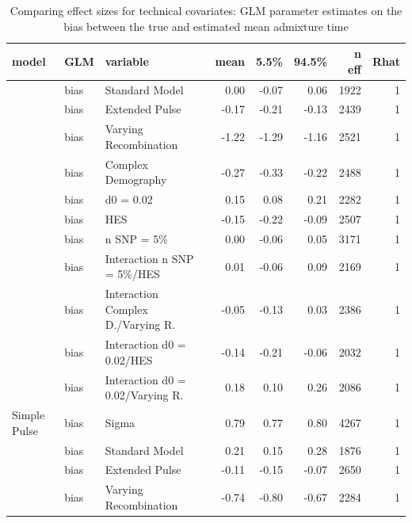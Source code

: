 \documentclass[11pt]{article}
\begin{document}
\begin{table}[H]
\fontsize{8}{9}\selectfont
\caption{\label{tab:table_Supplements_ests_bias}Comparing effect sizes for technical covariates: GLM parameter estimates on the bias between the true and estimated mean admixture time}
\centering

\begin{tabular}[t]{l|l|l|r|r|r|r|r}
\hline
model & GLM & variable & mean & 5.5\% & 94.5\% & n eff & Rhat\\
\hline
 & bias & Standard Model & 0.00 & -0.07 & 0.06 & 1922 & 1\\

 & bias & Extended Pulse & -0.17 & -0.21 & -0.13 & 2439 & 1\\

 & bias & Varying Recombination & -1.22 & -1.29 & -1.16 & 2521 & 1\\

 & bias & Complex Demography & -0.27 & -0.33 & -0.22 & 2488 & 1\\

 & bias & d0 = 0.02 & 0.15 & 0.08 & 0.21 & 2282 & 1\\

 & bias & HES & -0.15 & -0.22 & -0.09 & 2507 & 1\\

 & bias & n SNP = 5\% & 0.00 & -0.06 & 0.05 & 3171 & 1\\

 & bias & Interaction n SNP = 5\%/HES & 0.01 & -0.06 & 0.09 & 2169 & 1\\

 & bias & Interaction Complex D./Varying R. & -0.05 & -0.13 & 0.03 & 2386 & 1\\

 & bias & Interaction d0 = 0.02/HES & -0.14 & -0.21 & -0.06 & 2032 & 1\\

 & bias & Interaction d0 = 0.02/Varying R. & 0.18 & 0.10 & 0.26 & 2086 & 1\\

\multirow{-12}{*}{\raggedright\arraybackslash Simple Pulse} & bias & Sigma & 0.79 & 0.77 & 0.80 & 4267 & 1\\
\cline{1-8}
 & bias & Standard Model & 0.21 & 0.15 & 0.28 & 1876 & 1\\

 & bias & Extended Pulse & -0.11 & -0.15 & -0.07 & 2650 & 1\\

 & bias & Varying Recombination & -0.74 & -0.80 & -0.67 & 2284 & 1\\


\end{tabular}
\end{table}
\end{document}
